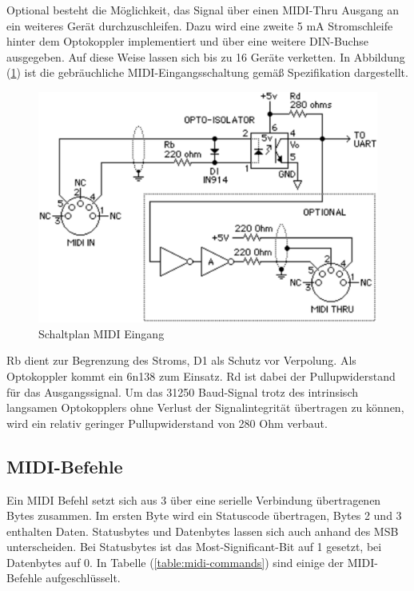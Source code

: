 Optional besteht die Möglichkeit, das Signal über einen MIDI-Thru Ausgang an ein weiteres Gerät durchzuschleifen. Dazu wird eine zweite 5 mA Stromschleife hinter dem Optokoppler implementiert und über eine weitere DIN-Buchse ausgegeben.
Auf diese Weise lassen sich bis zu 16 Geräte verketten.
In Abbildung (\ref{fig:schaltplan-midi-inout}) ist die gebräuchliche MIDI-Eingangsschaltung gemäß Spezifikation dargestellt.
\begin{figure}[h]
    \centering
    \includegraphics[width=0.7 \linewidth]{Images/midi-schematic.png}
    \caption{Schaltplan MIDI Eingang \cite[S. 2]{midi}}
    \label{fig:schaltplan-midi-inout}
\end{figure}

Rb dient zur Begrenzung des Stroms, D1 als Schutz vor Verpolung.
Als Optokoppler kommt ein 6n138 zum Einsatz. Rd ist dabei der Pullupwiderstand für das Ausgangssignal. Um das 31250 Baud-Signal trotz des intrinsisch langsamen Optokopplers ohne Verlust der Signalintegrität übertragen zu können, wird ein relativ geringer Pullupwiderstand von 280 Ohm verbaut.

\subsection{MIDI-Befehle}

Ein MIDI Befehl setzt sich aus 3 über eine serielle Verbindung übertragenen Bytes zusammen.
Im ersten Byte wird ein Statuscode übertragen, Bytes 2 und 3 enthalten Daten.
Statusbytes und Datenbytes lassen sich auch anhand des MSB unterscheiden. Bei Statusbytes ist das Most-Significant-Bit auf 1 gesetzt, bei Datenbytes auf 0.
In Tabelle (\ref{table:midi-commands}) sind einige der MIDI-Befehle aufgeschlüsselt.


